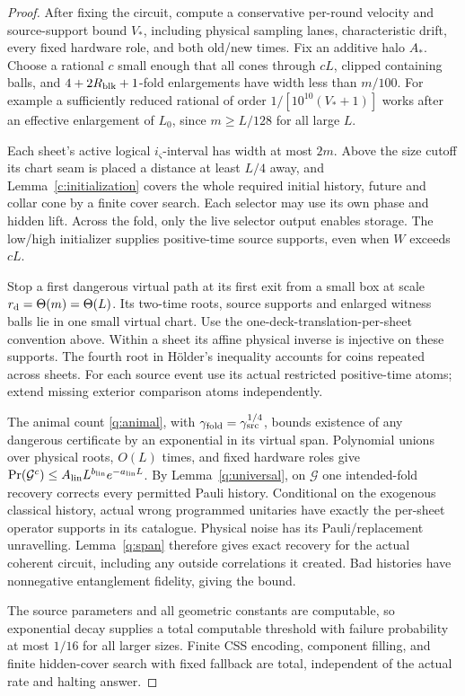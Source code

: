 \begin{proof}
After fixing the circuit, compute a conservative per-round
velocity and source-support bound \(V_*\), including physical sampling lanes, characteristic drift, every fixed hardware role, and both
old/new times. Fix an additive halo \(A_*\). Choose a rational \(c\)
small enough that all cones through \(cL\), clipped containing balls,
and \(4+2R_{\rm blk}+1\)-fold enlargements have width less than \(m/100\).
For example a sufficiently reduced rational of order
\(1/[10^{10}(V_*+1)]\) works after an effective enlargement of
\(L_0\), since \(m\ge L/128\) for all large \(L\).

Each sheet's active logical \(i_\varsigma\)-interval has width at most
\(2m\). Above the size cutoff its chart seam is placed a distance
at least \(L/4\) away, and Lemma~\ref{c:initialization} covers the whole
required initial history, future and collar cone by a finite cover search. Each selector
may use its own phase and hidden lift. Across the fold, only the live selector output enables storage. The low/high initializer supplies positive-time
source supports, even when \(W\) exceeds \(cL\).

Stop a first dangerous virtual path at its first exit from a small
box at scale \mbox{\(r_{\rm d}=\Theta(m)=\Theta(L)\)}. Its two-time roots,
source supports and enlarged witness balls lie in one
small virtual chart. Use the one-deck-translation-per-sheet
convention above. Within a sheet its affine physical inverse is
injective on these supports. The fourth root in H\"older's inequality accounts for coins repeated across sheets. For each source event use its actual
restricted positive-time atoms; extend missing exterior comparison
atoms independently.

The animal count \eqref{q:animal}, with
\(\gamma_{\rm fold}=\gamma_{\rm src}^{1/4}\), bounds existence of any dangerous
certificate by an exponential in its virtual span. Polynomial
unions over physical roots, \(O(L)\) times, and fixed hardware roles
give
\(\Pr(\mathcal G^c)\le A_{\rm lin}L^{b_{\rm lin}}e^{-a_{\rm lin}L}\).
By Lemma~\ref{q:universal}, on \(\mathcal G\) one intended-fold
recovery corrects every permitted Pauli history. Conditional on the
exogenous classical history, actual wrong programmed unitaries have
exactly the per-sheet operator supports in its catalogue. Physical
noise has its Pauli/replacement unravelling.
Lemma~\ref{q:span} therefore gives exact recovery for the actual
coherent circuit, including any outside correlations it created.
Bad histories have nonnegative entanglement fidelity, giving the bound.

The source parameters and all geometric constants are computable,
so exponential decay supplies a total computable threshold with
failure probability at most \(1/16\) for all larger sizes.
Finite CSS encoding, component filling, and finite hidden-cover
search with fixed fallback are total, independent of the actual
rate and halting answer. 
\end{proof}





